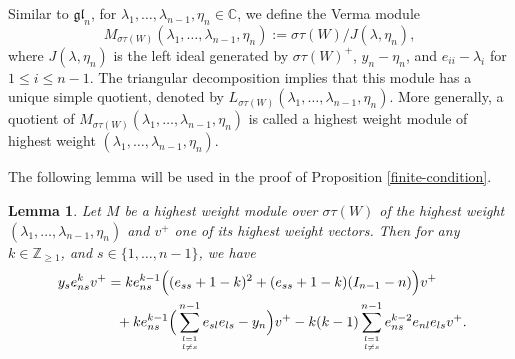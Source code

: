 \documentclass[12pt,a4paper]{amsart}
\newtheorem{lemma}[theorem]{Lemma}%
\numberwithin{equation}{section}
\newcommand{\C}{\mathbb C}
\newcommand{\Z}{\mathbb{Z}}
\def\gl{\mathfrak{gl}}
\def\l{\lambda}
\begin{document}
Similar to $\gl_n$, for $\l_1,\dots,\l_{n-1},\eta_n\in \C$, we  define
the Verma module
\[
 M_{\sigma\tau(W)}(\l_1,\dots,\l_{n-1},\eta_n)
 :=\sigma\tau(W)/J(\l,\eta_n),
\]
where $J(\l,\eta_n)$ is the left ideal generated by
$\sigma\tau(W)^+$, $y_n-\eta_n$, and $e_{ii}-\l_i$
for $1\leq i\leq n-1$. The triangular decomposition implies that this
module has a unique simple quotient, denoted by
$L_{\sigma\tau(W)}(\l_1,\dots,\l_{n-1},\eta_n)$. More generally, a
quotient of $M_{\sigma\tau(W)}(\l_1,\dots,\l_{n-1},\eta_n)$ is called a
highest weight module of highest weight $(\l_1,\dots,\l_{n-1},\eta_n)$.
\

The following lemma will be used in the proof of Proposition \ref{finite-condition}.

\begin{lemma}\label{key-lemma}Let $M$ be a highest weight module over $\sigma\tau(W)$ of the  highest weight $(\l_1,\dots,\l_{n-1},\eta_n)$ and $v^+$ one of its  highest weight vectors. Then for any $k\in \Z_{\geq 1}$, and $s\in\{1,\dots,n-1\}$, we have
$$\aligned \  y_{s}e_{ns}^{k}v^+
&=ke_{ns}^{k-1}\Big( (e_{ss}+1-k)^2+(e_{ss}+1-k)(I_{n-1}-n)\Big)v^+\\
&\ \ +ke_{ns}^{k-1}\Big(\sum_{l=1\atop l\neq s}^{n-1} e_{sl}e_{ls}-y_n\Big)v^+
 -k(k-1)\sum_{l=1\atop l\neq s}^{n-1}e_{ns}^{k-2}e_{nl}e_{ls}v^+.
\endaligned $$
\end{lemma}
\end{document}
